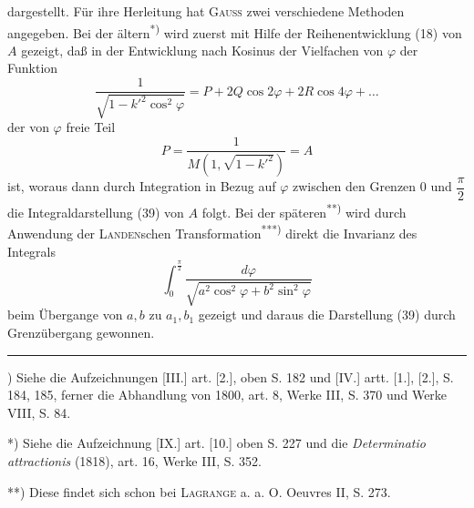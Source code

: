\clearpage
\fancyhead{}
\noindent dargestellt. Für ihre Herleitung hat \textsc{Gauss} zwei verschiedene Methoden angegeben. Bei der ältern\textsuperscript{*)} wird zuerst mit Hilfe der Reihenentwicklung (18) von $A$ gezeigt, daß in der Entwicklung nach Kosinus der Vielfachen von $\varphi$ der Funktion
\[\frac1{\sqrt{1-k'^2\cos^2\varphi}}=P+2Q\cos2\varphi+2R\cos4\varphi+\ldots\]
\noindent der von $\varphi$ freie Teil
\[P=\frac1{M(1,\sqrt{1-k'^2})}=A\]
\noindent ist, woraus dann durch Integration in Bezug auf $\varphi$ zwischen den Grenzen $0$ und $\dfrac\pi2$ die Integraldarstellung (39) von $A$ folgt. Bei der späteren\textsuperscript{**)} wird durch Anwendung der \textsc{Landen}schen Transformation\textsuperscript{***)} direkt die Invarianz des Integrals
\[\int_0^{\frac\pi2}\frac{d\varphi}{\sqrt{a^2\cos^2\varphi+b^2\sin^2\varphi}}\]
\noindent beim Übergange von $a,b$ zu $a_1,b_1$ gezeigt und daraus die Darstellung (39) durch Grenzübergang gewonnen.
\ClosingRule
\vfill
\par\smallskip\noindent\rule{.25\linewidth}{.4pt}\par
{\small
\par\indent *) Siehe die Aufzeichnungen [III.] art. [2.], oben S. 182 und [IV.] artt. [1.], [2.], S. 184, 185, ferner die Abhandlung von 1800, art. 8, Werke III, S. 370 und Werke VIII, S. 84.
\par\indent **) Siehe die Aufzeichnung [IX.] art. [10.] oben S. 227 und die \textit{Determinatio attractionis} (1818), art. 16, Werke III, S. 352.
\par\indent ***) Diese findet sich schon bei \textsc{Lagrange} a. a. O. Oeuvres II, S. 273.
\par}
\clearpage
\endgroup
